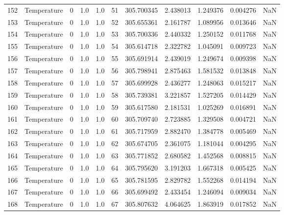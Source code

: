 \begin{tabular}{llrrrrrrrrr}
152 &  Temperature &       0 &  1.0 &  1.0 &   51 &  305.700345 &  2.438013 &  1.249376 &   0.004276 &      NaN \\
153 &  Temperature &       0 &  1.0 &  1.0 &   52 &  305.655361 &  2.161787 &  1.089956 &   0.013646 &      NaN \\
154 &  Temperature &       0 &  1.0 &  1.0 &   53 &  305.700336 &  2.440332 &  1.250152 &   0.011768 &      NaN \\
155 &  Temperature &       0 &  1.0 &  1.0 &   54 &  305.614718 &  2.322782 &  1.045091 &   0.009723 &      NaN \\
156 &  Temperature &       0 &  1.0 &  1.0 &   55 &  305.691914 &  2.439019 &  1.249674 &   0.009398 &      NaN \\
157 &  Temperature &       0 &  1.0 &  1.0 &   56 &  305.798941 &  2.875463 &  1.581532 &   0.013848 &      NaN \\
158 &  Temperature &       0 &  1.0 &  1.0 &   57 &  305.699928 &  2.436277 &  1.248063 &   0.015217 &      NaN \\
159 &  Temperature &       0 &  1.0 &  1.0 &   58 &  305.739381 &  3.221857 &  1.527205 &   0.014429 &      NaN \\
160 &  Temperature &       0 &  1.0 &  1.0 &   59 &  305.617580 &  2.181531 &  1.025269 &   0.016891 &      NaN \\
161 &  Temperature &       0 &  1.0 &  1.0 &   60 &  305.709740 &  2.723885 &  1.329508 &   0.004721 &      NaN \\
162 &  Temperature &       0 &  1.0 &  1.0 &   61 &  305.717959 &  2.882470 &  1.384778 &   0.005469 &      NaN \\
163 &  Temperature &       0 &  1.0 &  1.0 &   62 &  305.674705 &  2.361075 &  1.181044 &   0.004295 &      NaN \\
164 &  Temperature &       0 &  1.0 &  1.0 &   63 &  305.771852 &  2.680582 &  1.452568 &   0.008815 &      NaN \\
165 &  Temperature &       0 &  1.0 &  1.0 &   64 &  305.795620 &  3.191203 &  1.667318 &   0.005425 &      NaN \\
166 &  Temperature &       0 &  1.0 &  1.0 &   65 &  305.781595 &  2.829782 &  1.552268 &   0.014194 &      NaN \\
167 &  Temperature &       0 &  1.0 &  1.0 &   66 &  305.699492 &  2.433454 &  1.246094 &   0.009034 &      NaN \\
168 &  Temperature &       0 &  1.0 &  1.0 &   67 &  305.807632 &  4.064625 &  1.863919 &   0.017852 &      NaN \\

\end{tabular}
